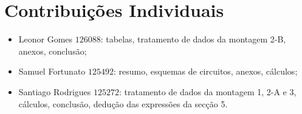 \section{Contribuições Individuais}

\begin{itemize}
    \renewcommand{\labelitemi}{--}
    \item Leonor Gomes $126088$: tabelas, tratamento de dados da montagem 2-B, anexos, conclusão;
    \item Samuel Fortunato $125492$: resumo, esquemas de circuitos, anexos, cálculos;
    \item Santiago Rodrigues $125272$: tratamento de dados da montagem 1, 2-A e 3, cálculos, conclusão, dedução das expressões da secção 5.
\end{itemize}